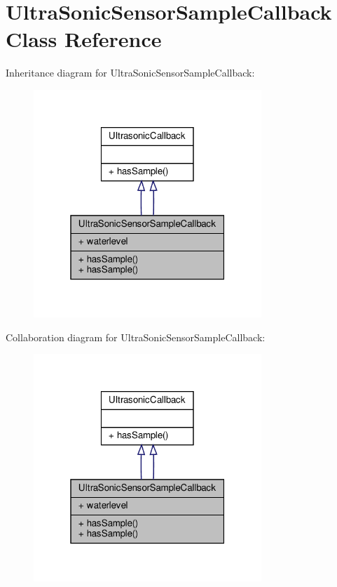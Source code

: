 \hypertarget{classUltraSonicSensorSampleCallback}{}\section{Ultra\+Sonic\+Sensor\+Sample\+Callback Class Reference}
\label{classUltraSonicSensorSampleCallback}


Inheritance diagram for Ultra\+Sonic\+Sensor\+Sample\+Callback\+:
\nopagebreak
\begin{figure}[H]
\begin{center}
\leavevmode
\includegraphics[width=244pt]{classUltraSonicSensorSampleCallback__inherit__graph}
\end{center}
\end{figure}


Collaboration diagram for Ultra\+Sonic\+Sensor\+Sample\+Callback\+:
\nopagebreak
\begin{figure}[H]
\begin{center}
\leavevmode
\includegraphics[width=244pt]{classUltraSonicSensorSampleCallback__coll__graph}
\end{center}
\end{figure}
